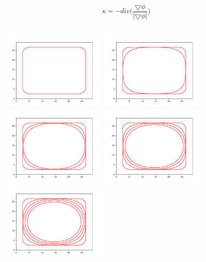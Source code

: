 \documentclass[12pt,fleqn]{article}\usepackage{../../common}
\begin{document}
$$ \kappa = -div \bigg( \frac{\bigtriangledown \phi}
{|\bigtriangledown \phi| } \bigg) $$

\inputminted[fontsize=\footnotesize]{python}{levelset1o.py}

\includegraphics[height=4cm]{img1/level_1_0.png}
\includegraphics[height=4cm]{img1/level_1_10.png}
\includegraphics[height=4cm]{img1/level_1_20.png}
\includegraphics[height=4cm]{img1/level_1_30.png}
\includegraphics[height=4cm]{img1/level_1_40.png}
\end{document}
